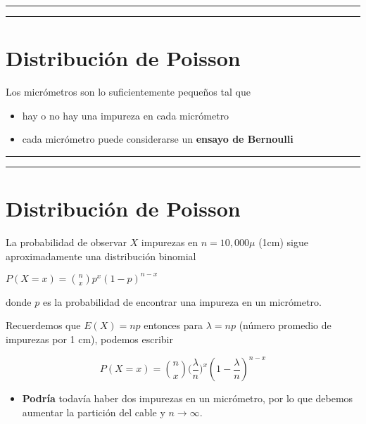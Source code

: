 \documentclass[
]{book}
\providecommand{\tightlist}{%
  \setlength{\itemsep}{0pt}\setlength{\parskip}{0pt}}
\begin{document}
\begin{center}\rule{0.5\linewidth}{0.5pt}\end{center}

\begin{center}\rule{0.5\linewidth}{0.5pt}\end{center}

\hypertarget{distribuciuxf3n-de-poisson}{%
\section{Distribución de Poisson}\label{distribuciuxf3n-de-poisson}}

Los micrómetros son lo suficientemente pequeños tal que

\begin{itemize}
\tightlist
\item
  hay o no hay una impureza en cada micrómetro
\item
  cada micrómetro puede considerarse un \textbf{ensayo de Bernoulli}
\end{itemize}

\begin{center}\rule{0.5\linewidth}{0.5pt}\end{center}

\begin{center}\rule{0.5\linewidth}{0.5pt}\end{center}

\hypertarget{distribuciuxf3n-de-poisson-1}{%
\section{Distribución de Poisson}\label{distribuciuxf3n-de-poisson-1}}

La probabilidad de observar \(X\) impurezas en \(n=10,000\mu\) (1cm) sigue aproximadamente una distribución binomial

\(P(X=x)=\binom n x p^x(1-p)^{n-x}\)

donde \(p\) es la probabilidad de encontrar una impureza en un micrómetro.

Recuerdemos que
\(E(X)=np\)
entonces para \(\lambda=np\) (número promedio de impurezas por 1 cm), podemos escribir

\[P(X=x)=\binom n x \big(\frac{\lambda}{n}\big)^x(1-\frac{\lambda}{n})^{n-x}\]

\begin{itemize}
\tightlist
\item
  \textbf{Podría} todavía haber dos impurezas en un micrómetro, por lo que debemos aumentar la partición del cable y \(n \rightarrow \infty\).
\end{itemize}
\end{document}
